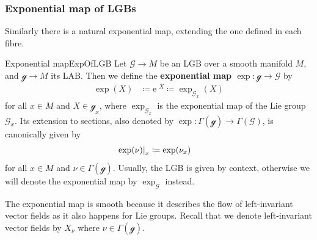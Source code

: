 \documentclass[reqno,a4paper,oneside]{amsart}
\newcommand{\e}{\ensuremath{\mathrm{e\;\!}}}
\theoremstyle{plain}
\theoremstyle{remark}
\theoremstyle{definition}
\begin{document}
\subsubsection{Exponential map of LGBs}\label{ExponentialMapSubsection}


Similarly there is a natural exponential map, extending the one defined in each fibre.

\begin{definitions}{Exponential map}{ExpOfLGB}
Let $\mathcal{G} \to M$ be an LGB over a smooth manifold $M$, and $\mathcal{g} \to M$ its LAB. Then we define the \textbf{exponential map $\exp \colon \mathcal{g} \to \mathcal{G}$} by
\begin{align*}
\exp(X) &\coloneqq \e^X \coloneqq \exp_{\mathcal{G}_x}(X)
\end{align*}
for all $x \in M$ and $X \in \mathcal{g}_x$, where $\exp_{\mathcal{G}_x}$ is the exponential map of the Lie group $\mathcal{G}_x$. Its extension to sections, also denoted by $\exp\colon \Gamma(\mathcal{g}) \to \Gamma(\mathcal{G})$, is canonically given by
\begin{align*}
\mleft.\exp(\nu)\mright|_x
&\coloneqq
\exp(\nu_x)
\end{align*}
for all $x \in M$ and $\nu \in \Gamma(\mathcal{g})$. Usually, the LGB is given by context, otherwise we will denote the exponential map by $\exp_{\mathcal{G}}$ instead.
\end{definitions}

The exponential map is smooth because it describes the flow of left-invariant vector fields as it also happens for Lie groups. Recall that we denote left-invariant vector fields by $X_\nu$ where $\nu \in \Gamma(\mathcal{g})$.
\end{document}
